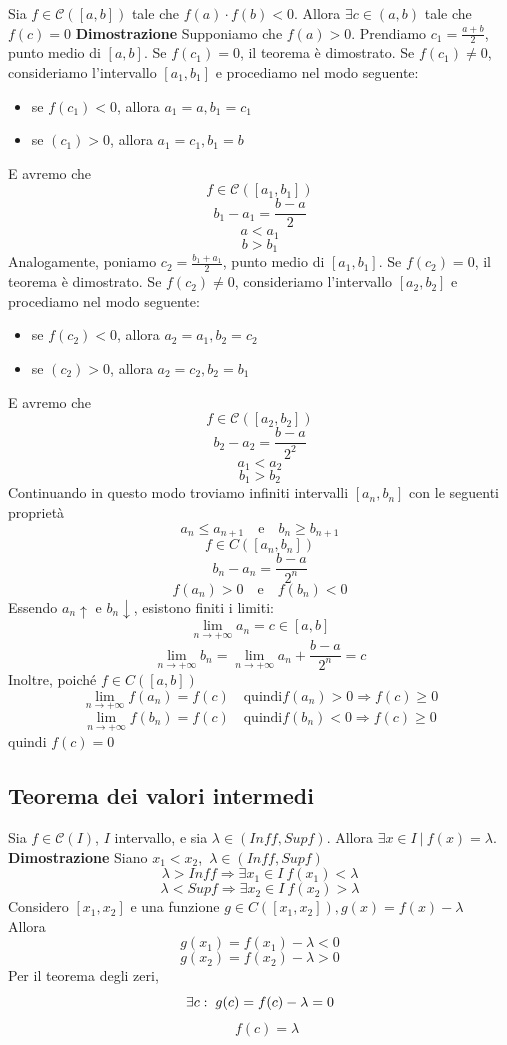 \documentclass[12pt]{article}
\begin{document}
Sia $f \in \mathscr{C}([a,b])$ tale che $f(a)\cdot f(b)<0$. Allora $\exists c \in (a,b)$ tale che $f(c) = 0$ \newline
\textbf{Dimostrazione} \newline
Supponiamo che $f(a) > 0$. Prendiamo $c_1 = \frac{a+b}{2}$, punto medio di $[a,b]$. Se $f(c_1)=0$, il teorema è dimostrato. Se $f(c_1) \neq 0$, consideriamo l'intervallo $[a_1, b_1]$ e procediamo nel modo seguente:
\begin{itemize}
  \item se $f(c_1) < 0$, allora $a_1 = a, b_1 = c_1$
  \item se $(c_1) > 0$, allora $a_1 = c_1, b_1 = b$
\end{itemize}
E avremo che 
\[ f \in \mathscr{C}([a_1,b_1]) \]
\[b_1 - a_1 = \frac{b-a}{2}\]
\[a<a_1\] 
\[b>b_1\]
Analogamente, poniamo $c_2 = \frac{b_1 + a_1}{2}$, punto medio di $[a_1,b_1]$. Se $f(c_2)=0$, il teorema è dimostrato. Se $f(c_2) \neq 0$, consideriamo l'intervallo $[a_2, b_2]$ e procediamo nel modo seguente:
\begin{itemize}
  \item se $f(c_2) < 0$, allora $a_2 = a_1, b_2 = c_2$
  \item se $(c_2) > 0$, allora $a_2 = c_2, b_2 = b_1$
\end{itemize}
E avremo che
\[ f \in \mathscr{C}([a_2,b_2]) \]
\[b_2 - a_2 = \frac{b-a}{2^2}\]
\[a_1<a_2\] 
\[b_1>b_2\]
Continuando in questo modo troviamo infiniti intervalli $[a_n, b_n]$
con le seguenti proprietà
\[
a_n \leq a_{n+1} \quad \text{e} \quad b_n \geq b_{n+1}
\]
\[ f \in C([a_n,b_n]) \]
\[ b_n - a_n = \frac{b-a}{2^n} \] 
\[ f(a_n)>0 \quad \text{e} \quad f(b_n) < 0 \]
\newpage
Essendo ${a_n}\uparrow$ e ${b_n}\downarrow$, esistono finiti i limiti:
\[ \lim_{n \to +\infty} a_n = c \in [a,b] \]
\[ \lim_{n \to +\infty} b_n = \lim_{n \to +\infty} a_n + \frac{b-a}{2^n} = c \]
Inoltre, poiché $f \in C([a,b])$
\[ \lim_{n \to +\infty} f(a_n) = f(c)\quad \text{quindi} f(a_n) >0 \Rightarrow f(c) \geq 0 \]
\[ \lim_{n \to +\infty} f(b_n) = f(c) \quad \text{quindi} f(b_n) <0 \Rightarrow f(c) \geq 0 \]
quindi $f(c) = 0$

\subsection{Teorema dei valori intermedi}
Sia $f \in \mathscr{C}(I)$, $I$ intervallo, e sia $\lambda \in (Inf f, Sup f)$.
Allora $\exists x \in I\ |\ f(x) = \lambda$.\newline
\textbf{Dimostrazione} \newline
Siano $x_1 < x_2$,\ $\lambda \in (Inf f, Sup f)$
\[ \lambda > Inf f \Rightarrow \exists x_1 \in I\ f(x_1) < \lambda \]
\[ \lambda < Sup f \Rightarrow \exists x_2 \in I\ f(x_2) > \lambda \]
Considero $[x_1,x_2]$ e una funzione $g \in C([x_1,x_2]), g(x) = f(x) - \lambda$\\
Allora 
\[g(x_1) = f(x_1) - \lambda < 0\] 
\[g(x_2) = f(x_2) - \lambda > 0\]
Per il teorema degli zeri,
\[\exists c: \hspace*{0.1cm} g(c) = f(c) - \lambda = 0 \]
\[\quad f(c) = \lambda \]
\end{document}
